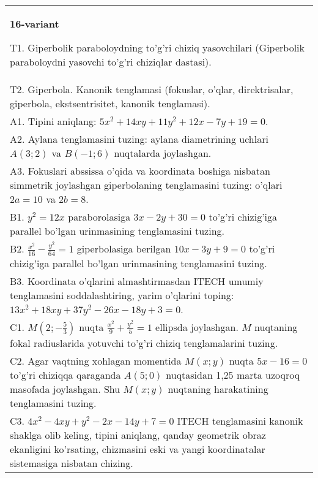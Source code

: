 \documentclass{article}
\begin{document}
\begin{tabular}{m{17cm}}
\textbf{16-variant}
\newline

T1. Giperbolik paraboloydning to'g'ri chiziq yasovchilari (Giperbolik paraboloydni yasovchi to'g'ri chiziqlar dastasi).\\

T2. Giperbola. Kanonik tenglamasi (fokuslar, o'qlar, direktrisalar, giperbola, ekstsentrisitet, kanonik tenglamasi).\\

A1. Tipini aniqlang: $5x^{2}+14xy+11y^{2}+12x-7y+19=0$.\\

A2. Aylana tenglamasini tuzing: aylana diametrining uchlari $A(3;2)$ va $B(-1;6)$ nuqtalarda joylashgan.\\

A3. Fokuslari abssissa o'qida va koordinata boshiga nisbatan simmetrik joylashgan giperbolaning tenglamasini tuzing: o'qlari $2a=10$ va $2b=8$.\\

B1. $y^{2} = 12x$ paraborolasiga $3x - 2y + 30 = 0$ to'g'ri chizig'iga parallel bo'lgan urinmasining tenglamasini tuzing.  \\

B2. $\frac{x^{2}}{16} - \frac{y^{2}}{64} = 1$ giperbolasiga berilgan $10x - 3y + 9 = 0$ to'g'ri chizig'iga parallel bo'lgan urinmasining tenglamasini tuzing.  \\

B3. Koordinata o'qlarini almashtirmasdan ITECH umumiy tenglamasini soddalashtiring, yarim o'qlarini toping: $13x^{2} + 18xy + 37y^{2} - 26x - 18y + 3 = 0$.  \\

C1. $M(2; - \frac{5}{3})$ nuqta $\frac{x^{2}}{9} + \frac{y^{2}}{5} = 1$ ellipsda joylashgan. $M$ nuqtaning fokal radiuslarida yotuvchi to'g'ri chiziq tenglamalarini tuzing.  \\

C2. Agar vaqtning xohlagan momentida $M(x;y)$ nuqta $5x - 16 = 0$ to'g'ri chiziqqa qaraganda $A(5;0)$ nuqtasidan 1,25 marta uzoqroq masofada joylashgan. Shu $M(x;y)$ nuqtaning harakatining tenglamasini tuzing.  \\

C3. $4x^{2} - 4xy + y^{2} - 2x - 14y + 7 = 0$ ITECH tenglamasini kanonik shaklga olib keling, tipini aniqlang, qanday geometrik obraz ekanligini ko'rsating, chizmasini eski va yangi koordinatalar sistemasiga nisbatan chizing.  \\

\end{tabular}
\vspace{1cm}
\end{document}
